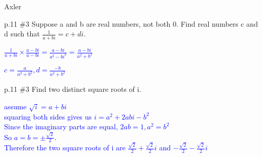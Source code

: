\documentclass{article}
\begin{document}
Axler

	 \qquad p.11 \#3 Suppose a and b are real numbers, not both 0. Find real numbers c and d such that $\frac{1}{a+bi} =  c+di.$
	 \textcolor{blue}{
	 \begin{center}
	 	$\frac{1}{a+bi}\times\frac{a-bi}{a-bi} = \frac{a-bi}{a^2-bi^{2}} = \frac{a-bi}{a^2+b^2}$
	 \end{center}
 	 \begin{center}
 	 	$c = \frac{a}{a^2+b^2}, d = \frac{-b}{a^2+b^2}$
 	 \end{center}}
  
  	 \qquad p.11 \#3 Find two distinct square roots of i.
  	 \textcolor{blue}{
  	 	\begin{center}
  	 		assume $\sqrt{i} = a+bi$\\
  	 		squaring both sides gives us $i = a^2 + 2abi - b^2$\\
  	 		Since the imaginary parts are equal, $2ab = 1, a^2 = b^2$\\
  	 		So $a = b = \pm \frac{\sqrt{2}}{2}.$\\
  	 		Therefore the two square roots of i are $\frac{\sqrt{2}}{2} + \frac{\sqrt{2}}{2}i$ and $- \frac{\sqrt{2}}{2} - \frac{\sqrt{2}}{2}i$
  	 	\end{center}}
\end{document}
